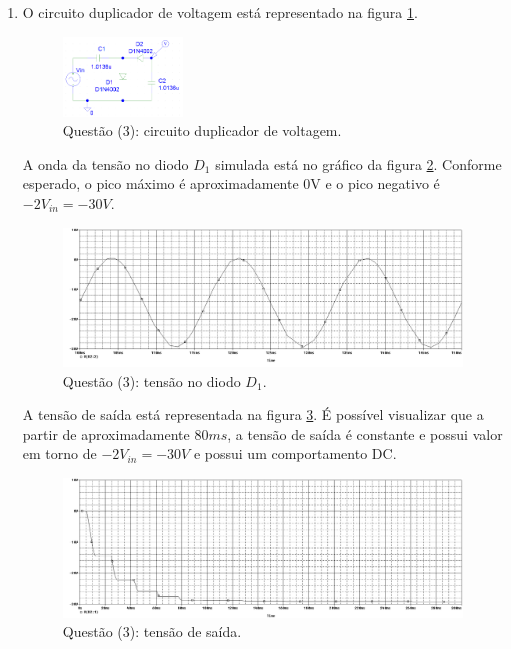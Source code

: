 \documentclass[12pt, a4paper]{article}
\begin{document}
\begin{enumerate}
            \item O circuito duplicador de voltagem está representado na figura \ref{circ23}.
            
            \begin{figure}[h!] 
                \centering
                \includegraphics[width=0.30\textwidth]{circ23}
                \caption{Questão (3): circuito duplicador de voltagem.}        
                \label{circ23}
            \end{figure}
            
            A onda da tensão no diodo \(D_1\) simulada está no gráfico da figura \ref{graf231}. Conforme esperado, o pico máximo é aproximadamente 0V e o pico negativo é \(-2V_{in} = -30V\).
             
            \begin{figure}[h!] 
                \centering
                \includegraphics[width=1\textwidth]{graf231}
                \caption{Questão (3): tensão no diodo \(D_1\).}        
                \label{graf231}
            \end{figure}
            
            
            A tensão de saída está representada na figura \ref{graf232}. É possível visualizar que a partir de aproximadamente \(80ms\), a tensão de saída é constante e possui valor em torno de \(-2V_{in} = -30V\) e possui um comportamento DC.
            
            \begin{figure}[h!] 
                \centering
                \includegraphics[width=1\textwidth]{graf232}
                \caption{Questão (3): tensão de saída.}        
                \label{graf232}
            \end{figure}
    \end{enumerate}
\end{document}
